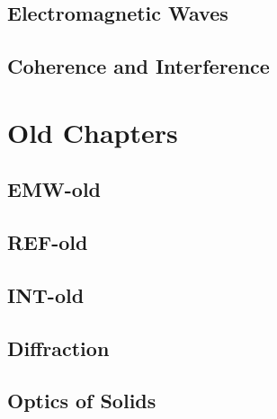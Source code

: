 \documentclass{book}
\begin{document}
\chapter{Electromagnetic Waves}

%
\chapter{Coherence and Interference}

\part{Old Chapters}
\chapter{EMW-old}

\chapter{REF-old}

\chapter{INT-old}

\begin{comment}
\part{Relativistic Electrodynamics}
\end{comment}
\chapter{Diffraction}

\chapter{Optics of Solids}

\end{document}
